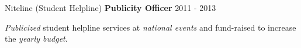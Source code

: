 \begin{cventries}
  \cventry
  	{}
  	{Niteline (Student Helpline)} %
    {\textbf{Publicity Officer}} %
    {2011 - 2013} %
    {
      \begin{cvitems} %
        \item {\textit{Publicized} student helpline services at \textit{national events} and fund-raised to increase the \textit{yearly budget}.}
      \end{cvitems}
    }
    
\end{cventries}
    

